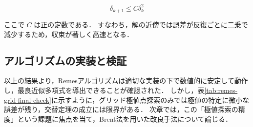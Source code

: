 \begin{equation}
  \delta_{k+1} \le C \delta_k^2
\end{equation}

ここで $C$ は正の定数である．
すなわち，解の近傍では誤差が反復ごとに二乗で減少するため，収束が著しく高速となる．

\label{subsec:algo_implementation}
\subsection{アルゴリズムの実装と検証}


以上の結果より，Remesアルゴリズムは適切な実装の下で数値的に安定して動作し，最良近似多項式を導出できることが確認された．
しかし，表\ref{tab:remes-grid-final-check}に示すように，グリッド極値点探索のみでは極値の特定に微小な誤差が残り，交替定理の成立には限界がある．
次章では，この「極値探索の精度」という課題に焦点を当て，Brent法を用いた改良手法について論じる．